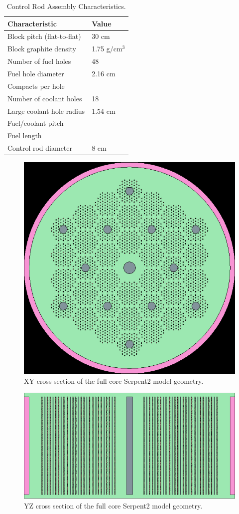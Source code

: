 \documentclass[11pt,letterpaper]{article}
\begin{document}
	\begin{table}[]
		\centering
	    \caption{Control Rod Assembly Characteristics.}
	    \label{tab:compact}
		\begin{tabular}{l|l}
		\hline
		Characteristic                   & Value         \\ \hline
		Block pitch (flat-to-flat)       & 30 cm         \\
		Block graphite density           & 1.75 g/cm$^3$ \\
		Number of fuel holes             & 48            \\
		Fuel hole diameter               & 2.16 cm       \\
		Compacts per hole                &               \\
		Number of coolant holes          & 18            \\
		Large coolant hole radius        & 1.54 cm       \\

		Fuel/coolant pitch               &               \\
		Fuel length                      &               \\ 
		Control rod diameter             & 8 cm          \\ 

		\hline

		\end{tabular}
	\end{table}

\begin{figure}[H]
	\centering
	\includegraphics[width=0.45\linewidth]{figures/MMR_full_stack_geom1.png}
	\hfill
	\caption{XY cross section of the full core Serpent2 model geometry.}
	\label{fig:FullXY}
\end{figure}

\begin{figure}[H]
	\centering
	\includegraphics[width=0.6\linewidth]{figures/MMR_full_stack_geom2.png}
	\hfill
	\caption{YZ cross section of the full core Serpent2 model geometry.}
	\label{fig:FullYZ}
\end{figure}
\end{document}
